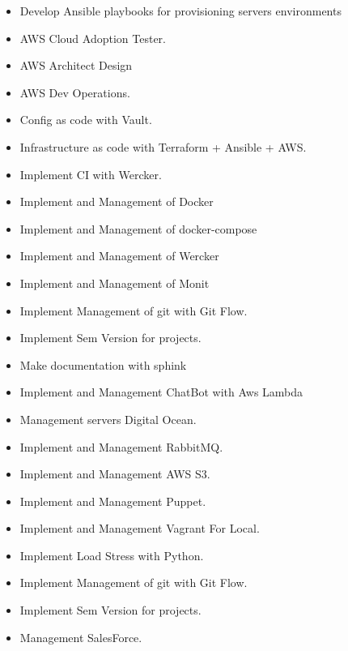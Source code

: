 \documentclass[10pt,a4paper]{altacv}
\begin{document}
\divider

\begin{itemize}
  \item Develop Ansible playbooks for provisioning servers environments
  \item AWS Cloud Adoption Tester.
  \item AWS Architect Design
  \item AWS Dev Operations.
  \item Config as code with Vault.
  \item Infrastructure as code with Terraform + Ansible + AWS.
  \item Implement CI with Wercker.
  \item Implement and Management of Docker
  \item Implement and Management of docker-compose
  \item Implement and Management of Wercker
  \item Implement and Management of Monit
  \item Implement Management of git with Git Flow.
  \item Implement Sem Version for projects.
  \item Make documentation with sphink
  \item Implement and Management ChatBot with Aws Lambda
\end{itemize}

\divider

\begin{itemize}
  \item Management servers Digital Ocean.
  \item Implement and Management RabbitMQ.
  \item Implement and Management AWS S3.
  \item Implement and Management Puppet.
  \item Implement and Management Vagrant For Local.
  \item Implement Load Stress with Python.
  \item Implement Management of git with Git Flow.
  \item Implement Sem Version for projects.
  \item Management SalesForce.
\end{itemize}

\divider
\end{document}
